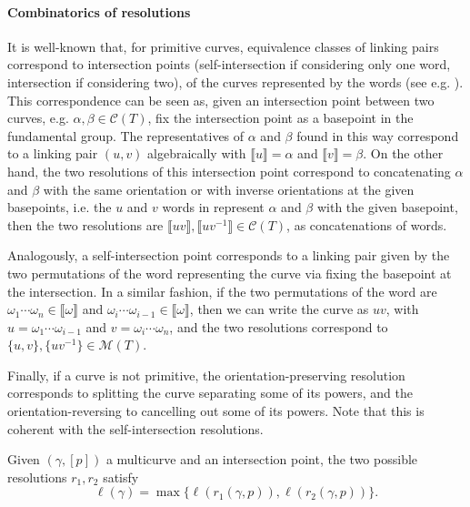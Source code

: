 \documentclass{article}
\begin{document}
	\paragraph{Combinatorics of resolutions} It is well-known that, for primitive curves, equivalence classes of linking pairs correspond to intersection points (self-intersection if considering only one word, intersection if considering two), of the curves represented by the words (see e.g. \cite{DL17}). This correspondence can be seen as, given an intersection point between two curves, e.g. $\alpha,\beta\in\mathcal{C}(T)$, fix the intersection point as a basepoint in the fundamental group. The representatives of $\alpha$ and $\beta$ found in this way correspond to a linking pair $(u,v)$ algebraically with $\llbracket u \rrbracket=\alpha$ and $\llbracket v \rrbracket=\beta$. On the other hand, the two resolutions of this intersection point correspond to concatenating $\alpha$ and $\beta$ with the same orientation or with inverse orientations at the given basepoints, i.e. the $u$ and $v$ words in represent $\alpha$ and $\beta$ with the given basepoint, then the two resolutions are $\llbracket uv\rrbracket,\llbracket uv^{-1}\rrbracket\in\mathcal{C}(T)$, as concatenations of words.
	
	Analogously, a self-intersection point corresponds to a linking pair given by the two permutations of the word representing the curve via fixing the basepoint at the intersection. In a similar fashion, if the two permutations of the word are $\omega_1\cdots \omega_n\in\llbracket \omega\rrbracket$ and $\omega_i\cdots \omega_{i-1}\in\llbracket \omega\rrbracket$, then we can write the curve as $uv$, with $u=\omega_1\cdots \omega_{i-1}$ and $v=\omega_i\cdots \omega_n$, and the two resolutions correspond to $\{u,v\},\{uv^{-1}\}\in\mathcal{M}(T)$.
	
	Finally, if a curve is not primitive, the orientation-preserving resolution corresponds to splitting the curve separating some of its powers, and the orientation-reversing to cancelling out some of its powers. Note that this is coherent with the self-intersection resolutions.
	
	\begin{lemma}\label{lem:max}
		Given $(\gamma,[p])$ a multicurve and an intersection point, the two possible resolutions $r_1,r_2$ satisfy
		\[
		\ell(\gamma)=\max\{\ell(r_1(\gamma,p)), \ell(r_2(\gamma,p))\}.
		\]
	\end{lemma}
	
\end{document}
